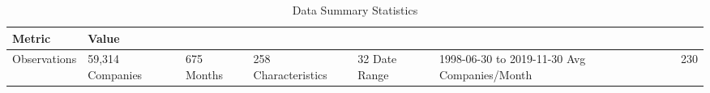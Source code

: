 \begin{table}[!ht]
\centering
\caption{Data Summary Statistics}
\label{tab:data_summary}
\begin{tabular}{l|l}
\hline
Metric & Value
\\\hline
Observations & 59,314
Companies & 675
Months & 258
Characteristics & 32
Date Range & 1998-06-30 to 2019-11-30
Avg Companies/Month & 230
\\\hline
\end{tabular}
\end{table}

